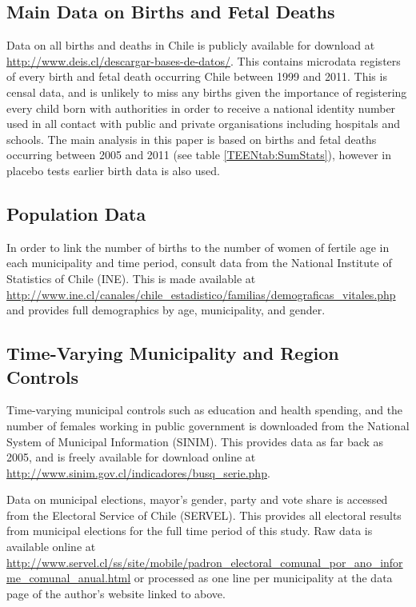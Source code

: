 \subsection{Main Data on Births and Fetal Deaths}
Data on all births and deaths in Chile is publicly available for download at
\url{http://www.deis.cl/descargar-bases-de-datos/}.  This contains microdata
registers of every birth and fetal death occurring Chile between 1999 and 2011.
This is censal data, and is unlikely to miss any births given the importance
of registering every child born with authorities in order to receive a national
identity number used in all contact with public and private organisations 
including hospitals and schools.  The main analysis in this paper is based on
births and fetal deaths occurring between 2005 and 2011 (see table 
\ref{TEENtab:SumStats}), however in placebo tests earlier birth data is also
used.

\subsection{Population Data}
In order to link the number of births to the number of women of fertile age in
each municipality and time period, \person consult data from the National 
Institute of Statistics of Chile (INE).  This is made available at 
\url{http://www.ine.cl/canales/chile_estadistico/familias/demograficas_vitales.php}
and provides full demographics by age, municipality, and gender.

\subsection{Time-Varying Municipality and Region Controls}
Time-varying municipal controls such as education and health spending, and the
number of females working in public government is downloaded from the National
System of Municipal Information (SINIM).  This provides data as far back as
2005, and is freely available for download online at
\url{http://www.sinim.gov.cl/indicadores/busq_serie.php}.

Data on municipal elections, mayor's gender, party and vote share is accessed
from the Electoral Service of Chile (SERVEL).  This provides all electoral
results from municipal elections for the full time period of this study.  Raw
data is available online at 
\url{http://www.servel.cl/ss/site/mobile/padron_electoral_comunal_por_ano_informe_comunal_anual.html}
or processed as one line per municipality at the data page of the author's
website linked to above.

